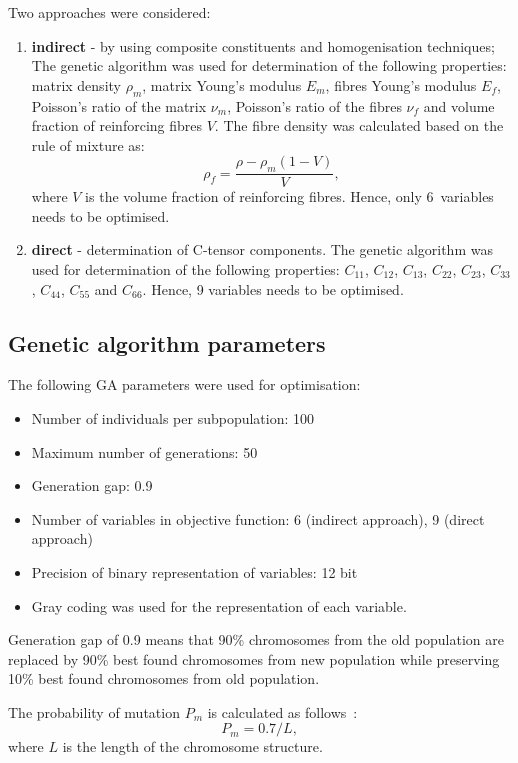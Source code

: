 \documentclass[preprint,12pt]{elsarticle}
\begin{document}
	Two approaches were considered:
	\begin{enumerate}
		\item \textbf{indirect} - by using composite constituents and homogenisation techniques;
		The genetic algorithm was used for determination of the following properties:  matrix density $\rho_m$, matrix Young's modulus $E_m$, fibres Young's modulus $E_f$, Poisson's ratio of the matrix $\nu_m$, Poisson's ratio of the fibres $\nu_f$ and volume fraction of reinforcing fibres $V$.  The fibre density was calculated based on the rule of mixture as:
		\begin{equation}
		\rho_f = \frac{\rho - \rho_m (1-V)}{V},
		\end{equation}
		where $V$ is the volume fraction of reinforcing fibres. Hence, only 6~variables needs to be optimised.
		\item \textbf{direct} - determination of C-tensor components.
		The genetic algorithm was used for determination of the following properties: $C_{11}$, $C_{12}$, $C_{13}$,  $C_{22}$, $C_{23}$, $C_{33}$, $C_{44}$, $C_{55}$ and $C_{66}$. Hence, 9 variables needs to be optimised.
	\end{enumerate}

	\subsection{Genetic algorithm parameters}
	The following GA parameters were used for optimisation:
	\begin{itemize}
		\item Number of individuals per subpopulation: 100
		\item Maximum number of generations: 50
		\item Generation gap: 0.9
		\item Number of variables in objective function: 6 (indirect approach), 9 (direct approach)
		\item Precision of binary representation of variables: 12 bit
		\item Gray coding was used for the representation of each variable.
   \end{itemize}
    Generation gap of 0.9 means that 90\% chromosomes from the old population are replaced by 90\% best found chromosomes from new population while preserving 10\% best found chromosomes from old population.
    
    The probability of mutation $P_m$ is calculated as follows~\cite{Chipperfield1994}:
    \begin{equation}
    	P_m = 0.7/L,
    \end{equation}
    where $L$ is the length of the chromosome structure.
    
\end{document}
